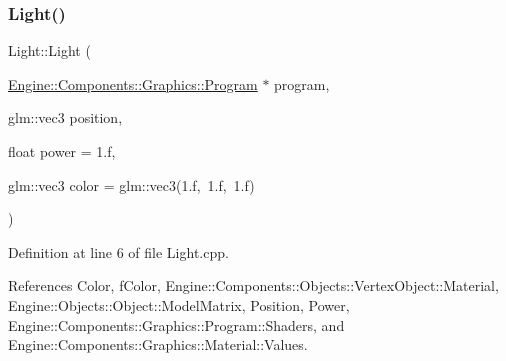 \subsubsection{\texorpdfstring{Light()}{Light()}}
{\footnotesize\ttfamily Light\+::\+Light (\begin{DoxyParamCaption}\item[{\mbox{\hyperlink{classEngine_1_1Components_1_1Graphics_1_1Program}{Engine\+::\+Components\+::\+Graphics\+::\+Program}} $\ast$}]{program,  }\item[{glm\+::vec3}]{position,  }\item[{float}]{power = {\ttfamily 1.f},  }\item[{glm\+::vec3}]{color = {\ttfamily glm\+:\+:vec3(1.f,~1.f,~1.f)} }\end{DoxyParamCaption})}



Definition at line 6 of file Light.\+cpp.



References Color, f\+Color, Engine\+::\+Components\+::\+Objects\+::\+Vertex\+Object\+::\+Material, Engine\+::\+Objects\+::\+Object\+::\+Model\+Matrix, Position, Power, Engine\+::\+Components\+::\+Graphics\+::\+Program\+::\+Shaders, and Engine\+::\+Components\+::\+Graphics\+::\+Material\+::\+Values.


